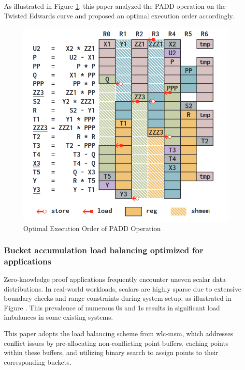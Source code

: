 \documentclass[journal=tches,final]{iacrtrans}
\begin{document}
As illustrated in Figure \ref{fig:padd-register}, this paper analyzed the PADD operation on the Twisted Edwards curve and proposed an optimal execution order accordingly.

\begin{figure}[h]
    \centering
    \label{fig:padd-register}
    \includegraphics[width=1\linewidth]{image/padd_register.png}
    \caption{Optimal Execution Order of PADD Operation}
\end{figure}

\subsubsection{\textbf{Bucket accumulation load balancing optimized for applications}}
Zero-knowledge proof applications frequently encounter uneven scalar data distributions. In real-world workloads, scalars are highly sparse due to extensive boundary checks and range constraints during system setup, as illustrated in Figure \todo{}. This prevalence of numerous 0s and 1s results in significant load imbalances in some existing systems.

This paper adopts the load balancing scheme from wlc-msm, which addresses conflict issues by pre-allocating non-conflicting point buffers, caching points within these buffers, and utilizing binary search to assign points to their corresponding buckets.
\end{document}

